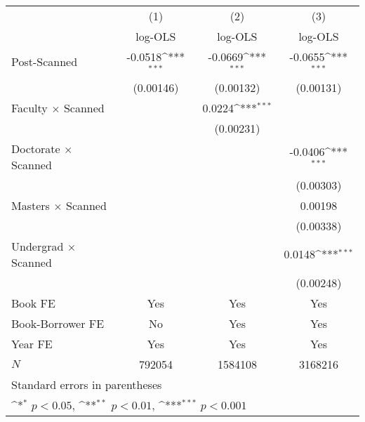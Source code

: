 {
\def\sym#1{\ifmmode^{#1}\else\(^{#1}\)\fi}
\begin{tabular}{l*{3}{c}}
\hline\hline
            &\multicolumn{1}{c}{(1)}&\multicolumn{1}{c}{(2)}&\multicolumn{1}{c}{(3)}\\
            &\multicolumn{1}{c}{log-OLS}&\multicolumn{1}{c}{log-OLS}&\multicolumn{1}{c}{log-OLS}\\
\hline
Post-Scanned&     -0.0518\sym{***}&     -0.0669\sym{***}&     -0.0655\sym{***}\\
            &   (0.00146)         &   (0.00132)         &   (0.00131)         \\
[1em]
Faculty $\times$ Scanned&                     &      0.0224\sym{***}&                     \\
            &                     &   (0.00231)         &                     \\
[1em]
Doctorate $\times$ Scanned&                     &                     &     -0.0406\sym{***}\\
            &                     &                     &   (0.00303)         \\
[1em]
Masters $\times$  Scanned&                     &                     &     0.00198         \\
            &                     &                     &   (0.00338)         \\
[1em]
Undergrad $\times$ Scanned&                     &                     &      0.0148\sym{***}\\
            &                     &                     &   (0.00248)         \\
\hline
Book FE     &         Yes         &         Yes         &         Yes         \\
Book-Borrower FE&          No         &         Yes         &         Yes         \\
Year FE     &         Yes         &         Yes         &         Yes         \\
\(N\)       &      792054         &     1584108         &     3168216         \\
\hline\hline
\multicolumn{4}{l}{\footnotesize Standard errors in parentheses}\\
\multicolumn{4}{l}{\footnotesize \sym{*} \(p<0.05\), \sym{**} \(p<0.01\), \sym{***} \(p<0.001\)}\\
\end{tabular}
}
